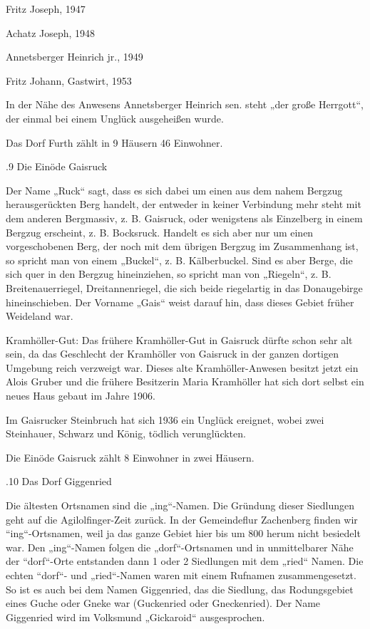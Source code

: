 \documentclass{book}
\begin{document}
Fritz Joseph, 1947

Achatz Joseph, 1948

Annetsberger Heinrich jr., 1949

Fritz Johann, Gastwirt, 1953



In der Nähe des Anwesens Annetsberger Heinrich sen. steht „der große Herrgott“,
der einmal bei einem Unglück ausgeheißen wurde.

Das Dorf Furth zählt in 9 Häusern 46 Einwohner.

.9 Die Einöde Gaisruck

Der Name „Ruck“ sagt, dass es sich dabei um einen aus dem nahem Bergzug
herausgerückten Berg handelt, der entweder in keiner Verbindung mehr steht mit
dem anderen Bergmassiv, z. B. Gaisruck, oder wenigstens als Einzelberg in einem
Bergzug erscheint, z. B. Bocksruck. Handelt es sich aber nur um einen
vorgeschobenen Berg, der noch mit dem übrigen Bergzug im Zusammenhang ist, so
spricht man von einem „Buckel“, z. B. Kälberbuckel. Sind es aber Berge, die sich
quer in den Bergzug hineinziehen, so spricht man von „Riegeln“, z. B.
Breitenauerriegel, Dreitannenriegel, die sich beide riegelartig in das
Donaugebirge hineinschieben. Der Vorname „Gais“ weist darauf hin, dass dieses
Gebiet früher Weideland war.

Kramhöller-Gut: Das frühere Kramhöller-Gut in Gaisruck dürfte schon sehr alt
sein, da das Geschlecht der Kramhöller von Gaisruck in der ganzen dortigen
Umgebung reich verzweigt war. Dieses alte Kramhöller-Anwesen besitzt jetzt ein
Alois Gruber und die frühere Besitzerin Maria Kramhöller hat sich dort selbst
ein neues Haus gebaut im Jahre 1906.

Im Gaisrucker Steinbruch hat sich 1936 ein Unglück ereignet, wobei zwei
Steinhauer, Schwarz und König, tödlich verunglückten.

Die Einöde Gaisruck zählt 8 Einwohner in zwei Häusern.

.10 Das Dorf Giggenried

Die ältesten Ortsnamen sind die „ing“-Namen. Die Gründung dieser Siedlungen geht
auf die Agilolfinger-Zeit zurück. In der Gemeindeflur Zachenberg finden wir
“ing“-Ortsnamen, weil ja das ganze Gebiet hier bis um 800 herum nicht besiedelt
war. Den „ing“-Namen folgen die „dorf“-Ortsnamen und in unmittelbarer Nähe der
“dorf“-Orte entstanden dann 1 oder 2 Siedlungen mit dem „ried“ Namen. Die echten
“dorf“- und „ried“-Namen waren mit einem Rufnamen zusammengesetzt. So ist es
auch bei dem Namen Giggenried, das die Siedlung, das Rodungsgebiet eines Guche
oder Gneke war (Guckenried oder Gneckenried). Der Name Giggenried wird im
Volksmund „Gickaroid“ ausgesprochen.
\end{document}
